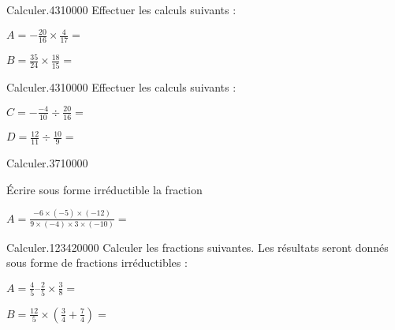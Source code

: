 
\begin{pageParcoursu} %




\begin{minipage}{0.5\linewidth}
\begin{ExoCuN}{Calculer.}{43}{1}{0}{0}{0}{0}
Effectuer les calculs suivants : \vspace{0.4cm}

$A=-\frac{20}{16} \times \frac{4}{17}=$

$B=\frac{35}{24} \times \frac{18}{15}=$
\end{ExoCuN}
\end{minipage}
\begin{minipage}{0.5\linewidth}
\begin{ExoCuN}{Calculer.}{43}{1}{0}{0}{0}{0}
Effectuer les calculs suivants : \vspace{0.4cm}

$C=-\frac{-4}{10} \div \frac{20}{16}=$

$D=\frac{12}{11} \div \frac{10}{9}=$


\end{ExoCuN}
\end{minipage}


\begin{ExoCuN}{Calculer.}{37}{1}{0}{0}{0}{0}

Écrire sous forme irréductible la fraction 

$A=\frac{-6 \times ( -5) \times (-12)}{9 \times ( -4) \times 3 \times (-10)}=$

\end{ExoCuN}



\begin{ExoCu}{Calculer.}{1234}{2}{0}{0}{0}{0}
Calculer les fractions suivantes. Les résultats seront donnés sous forme de fractions irréductibles : \vspace{0.4cm}

$A=\frac{4}{5} – \frac{2}{5} \times \frac{3}{8}=$ 

$B = \frac{12}{5} \times \left(\frac{3}{4} + \frac{7}{4} \right)=$ 


\end{ExoCu}
\end{pageParcoursu}

